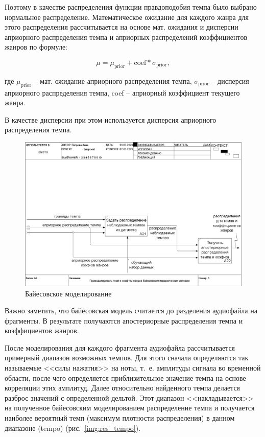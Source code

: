 Поэтому в качестве распределения функции правдоподобия темпа было выбрано нормальное распределение. Математическое ожидание для каждого жанра для этого распределения рассчитывается на основе мат. ожидания и дисперсии априорного распределения темпа и априорных распределений коэффициентов жанров по формуле:

\begin{equation}
	\mu = \mu_{\text{prior}} + \text{coef} * \sigma_{\text{prior}},
\end{equation}

где $\mu_{\text{prior}}$ -- мат. ожидание априорного распределения темпа, $\sigma_{\text{prior}}$ -- дисперсия априорного распределения темпа, coef -- априорный коэффициент текущего жанра.

В качестве дисперсии при этом используется дисперсия априорного распределения темпа.

\begin{figure}[h]
	\centering
	\includegraphics[scale=0.25]{inc/img/tempo_idef/03_A2.png}
	\caption{Байесовское моделирование}
	\label{img:tempo_2}
\end{figure}

Важно заметить, что байесовская модель считается до разделения аудиофайла на фрагменты. В результате получаются апостериорные распределения темпа и коэффициентов жанров.

После моделирования для каждого фрагмента аудиофайла рассчитывается примерный диапазон возможных темпов. Для этого сначала определяются так называемые <<силы нажатия>> на ноты, т.~е. амплитуды сигнала во временной области, после чего определяется приблизительное значение темпа на основе корреляции этих амплитуд. Далее относительно найденного темпа делается разброс значений с определенной дельтой. Этот диапазон <<накладывается>> на полученное байесовским моделированием распределение темпа и получается наиболее вероятный темп (максимум плотности распределения) в данном диапазоне (tempo) (рис.~\ref{img:res_tempo}).


